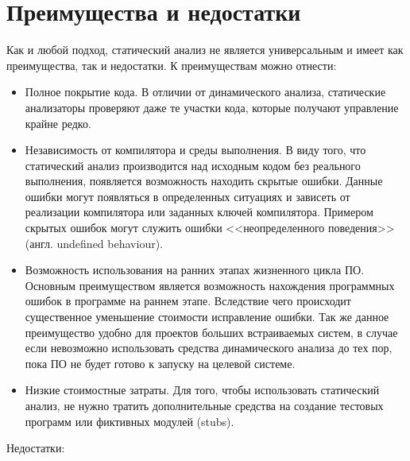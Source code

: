 \section{Преимущества и недостатки}
Как и любой подход, статический анализ не является универсальным и имеет 
как преимущества, так и недостатки.
К преимуществам можно отнести:
\begin{itemize}
	\item Полное покрытие кода. 
	В отличии от динамического анализа, статические анализаторы проверяют даже те участки кода, 
которые получают управление крайне редко.

	\item Независимость от компилятора и среды выполнения.
	В виду того, что статический анализ производится над исходным кодом без реального выполнения,
появляется возможность находить скрытые ошибки. Данные ошибки могут появляться в определенных ситуациях 
и зависеть от реализации компилятора или заданных ключей компилятора. Примером скрытых ошибок могут
служить ошибки <<неопределенного поведения>> (англ. undefined behaviour).
	
	\item Возможность использования на ранних этапах жизненного цикла ПО.
	Основным преимуществом является возможность нахождения программных ошибок в программе на раннем этапе.
Вследствие чего происходит существенное уменьшение стоимости исправление ошибки. Так же данное 
преимущество удобно для проектов больших встраиваемых систем, в случае если невозможно
использовать средства динамического анализа  до тех пор, пока ПО не будет готово к запуску на целевой системе.

	\item Низкие стоимостные затраты. 
	Для того, чтобы использовать статический анализ, не нужно тратить дополнительные средства 
на создание тестовых программ или фиктивных модулей (stubs).    
\end{itemize}
Недостатки:
